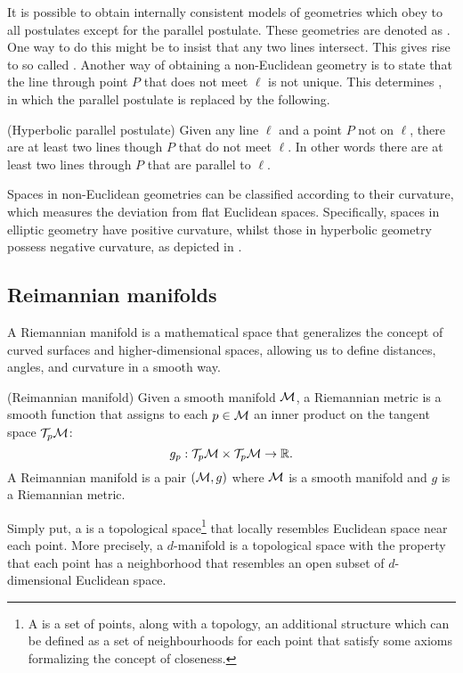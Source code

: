 It is possible to obtain internally consistent models of geometries which obey to all postulates except for the parallel postulate. These geometries are denoted as . One way to do this might be to insist that any two lines intersect. This gives rise to so called . Another way of obtaining a non-Euclidean geometry is to state that the line through point $P$ that does not meet $\ell$ is not unique. This determines , in which the parallel postulate is replaced by the following.


\begin{postulate}(Hyperbolic parallel postulate)
    Given any line $\ell$ and a point $P$ not on $\ell$, there are at least two lines though $P$ that do not meet $\ell$. In other words there are at least two lines through $P$ that are parallel to $\ell$.
\end{postulate}



Spaces in non-Euclidean geometries can be classified according to their curvature, which measures the deviation from flat Euclidean spaces. Specifically, spaces in elliptic geometry have positive curvature, whilst those in hyperbolic geometry possess negative curvature, as depicted in . 

\subsection{Reimannian manifolds}
A Riemannian manifold is a mathematical space that generalizes the concept of curved surfaces and higher-dimensional spaces, allowing us to define distances, angles, and curvature in a smooth way. 

\begin{definition} (Reimannian manifold)
Given a smooth manifold $\mathcal{M}$, a Riemannian metric is a smooth function that assigns to each $p \in \mathcal{M}$ an inner product on the tangent space $\mathcal{T}_p\mathcal{M}$:
\begin{equation*}
    g_p: \mathcal{T}_p\mathcal{M} \times \mathcal{T}_p\mathcal{M} \to \mathbb{R}.
\end{equation*}
    A Reimannian manifold is a pair $(\mathcal{M},g)$ where $\mathcal{M}$ is a smooth manifold and $g$ is a Riemannian metric.
\end{definition}

Simply put, a  is a topological space\footnote{A  is a set of points, along with a topology, an additional structure which can be defined as a set of neighbourhoods for each point that satisfy some axioms formalizing the concept of closeness.} that locally resembles Euclidean space near each point. More precisely, a $d$-manifold  is a topological space with the property that each point has a neighborhood that resembles an open subset of $d$-dimensional Euclidean space. 

